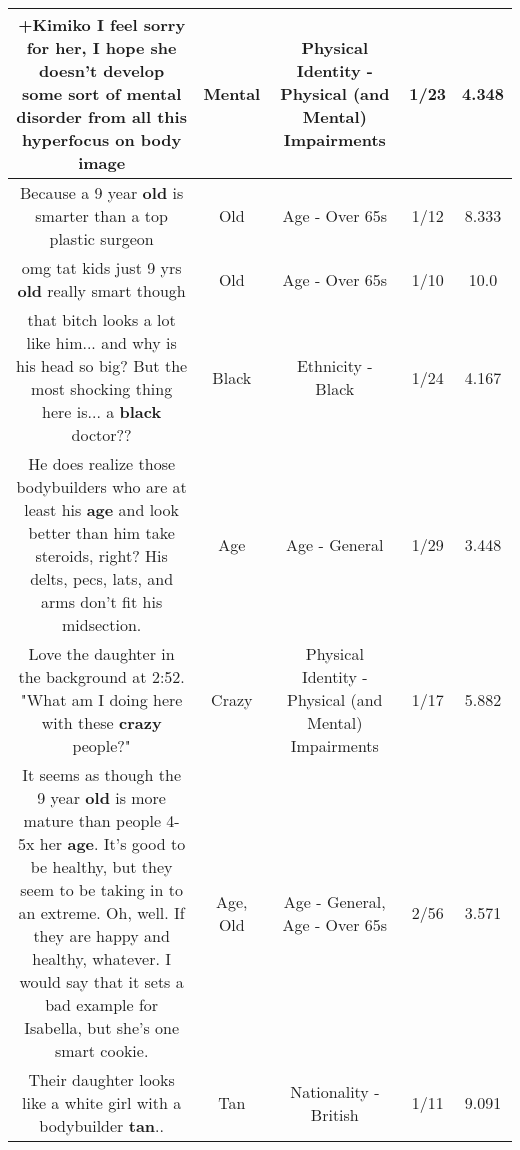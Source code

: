 \documentclass[11pt]{article}
\newlength\mylength
\begin{document}
\begin{center}
\begin{longtable}{|C{.65\mylength}|C{.30\mylength}|C{.12\mylength}|C{.12\mylength}|C{.12\mylength}|}
  \small +Kimiko I feel sorry for her, I hope she doesn't develop some sort of \textbf{mental} disorder from all this hyperfocus on body image\normalsize   & Mental & Physical Identity - Physical (and Mental) Impairments & 1/23 & 4.348 \\  \hline
  \small Because a 9 year \textbf{old} is smarter than a top plastic surgeon\normalsize   & Old & Age - Over 65s & 1/12 & 8.333 \\  \hline
  \small omg tat kids just 9 yrs \textbf{old} really smart though\normalsize   & Old & Age - Over 65s & 1/10 & 10.0 \\  \hline
  \small that bitch looks a lot like him... and why is his head so big? But the most shocking thing here is... a \textbf{black} doctor??\normalsize   & Black & Ethnicity - Black & 1/24 & 4.167 \\  \hline
  \small He does realize those bodybuilders who are at least his \textbf{age} and look better than him take steroids, right? His delts, pecs, lats, and arms don't fit his midsection.\normalsize   & Age & Age - General & 1/29 & 3.448 \\  \hline
  \small Love the daughter in the background at 2:52. "What am I doing here with these \textbf{crazy} people?"\normalsize   & Crazy & Physical Identity - Physical (and Mental) Impairments & 1/17 & 5.882 \\  \hline
  \small It seems as though the 9 year \textbf{old} is more mature than people 4-5x her \textbf{age}. It's good to be healthy, but they seem to be taking in to an extreme. Oh, well. If they are happy and healthy, whatever. I would say that it sets a bad example for Isabella, but she's one smart cookie.\normalsize   & Age, Old & Age - General, Age - Over 65s & 2/56 & 3.571 \\  \hline
  \small Their daughter looks like a white girl with a bodybuilder \textbf{tan}..\normalsize   & Tan & Nationality - British & 1/11 & 9.091 \\  \hline

\end{longtable}
\end{center}
\end{document}

